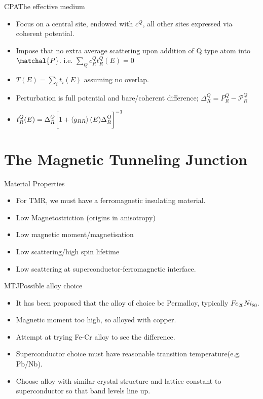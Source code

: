 \documentclass{beamer}
\begin{document}
\begin{frame}{CPA}{The effective medium}
    \begin{itemize}
        \item{Focus on a central site, endowed with $c^Q$, all other sites expressed via coherent potential.}
        \item{Impose that no extra average scattering upon addition of Q type atom into $\matchal{P}$. i.e. $\sum_Qc_R^Qt_R^Q(E)=0$}
        \item{$T(E)=\sum_it_i(E)$ assuming no overlap.}
        \item{Perturbation is full potential and bare/coherent difference; $\Delta^Q_R=P_R^Q-\mathcal{P}^Q_R$}
        \item{$t_R^Q(E)=\Delta^Q_R\bigg[1+\expval{g_{RR}}(E)\Delta^Q_R\bigg]^{-1}$}
    \end{itemize}
\end{frame}
\section{The Magnetic Tunneling Junction}
\begin{frame}{Material Properties}
  \begin{itemize}
      \item {For TMR, we must have a ferromagnetic insulating material.}
      \item {Low Magnetostriction (origins in anisotropy)}
      \item {Low magnetic moment/magnetisation}
      \item {Low scattering/high spin lifetime}
      \item {Low scattering at superconductor-ferromagnetic interface.}
  \end{itemize}
\end{frame}

\begin{frame}{MTJ}{Possible alloy choice}
  \begin{itemize}
      \item {It has been proposed that the alloy of choice be Permalloy, typically $Fe_{20}Ni_{80}$.}
      \item {Magnetic moment too high, so alloyed with copper.}
      \item {Attempt at trying Fe-Cr alloy to see the difference.}
      \item {Superconductor choice must have reasonable transition temperature(e.g. Pb/Nb).}
      \item {Choose alloy with similar crystal structure and lattice constant to superconductor so that band levels line up.}
  \end{itemize}
\end{frame}
\end{document}
